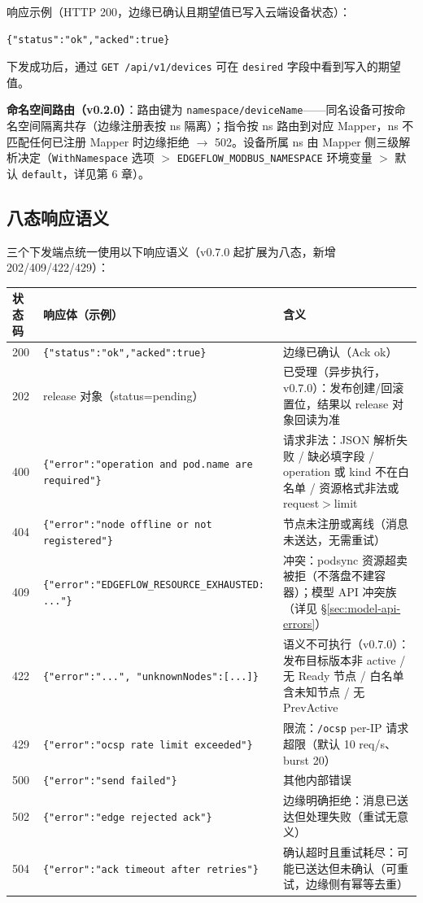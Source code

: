 响应示例（HTTP 200，边缘已确认且期望值已写入云端设备状态）：

\begin{lstlisting}
{"status":"ok","acked":true}
\end{lstlisting}

下发成功后，通过 \texttt{GET /api/v1/devices} 可在 \texttt{desired} 字段中看到写入的期望值。

\textbf{命名空间路由（v0.2.0）}：路由键为 \texttt{namespace/deviceName}——同名设备可按命名空间隔离共存（边缘注册表按 ns 隔离）；指令按 ns 路由到对应 Mapper，ns 不匹配任何已注册 Mapper 时边缘拒绝 $\rightarrow$ 502。设备所属 ns 由 Mapper 侧三级解析决定（\texttt{WithNamespace} 选项 $>$ \texttt{EDGEFLOW\_MODBUS\_NAMESPACE} 环境变量 $>$ 默认 \texttt{default}，详见第 6 章）。

\subsection{八态响应语义}

三个下发端点统一使用以下响应语义（v0.7.0 起扩展为八态，新增 202/409/422/429）：

\begin{tabularx}{\textwidth}{l l X}
  \toprule
  \textbf{状态码} & \textbf{响应体（示例）} & \textbf{含义} \\
  \midrule
  200 & \texttt{\{"status":"ok","acked":true\}} & 边缘已确认（Ack ok） \\
  202 & release 对象（status=pending） & 已受理（异步执行，v0.7.0）：发布创建/回滚置位，结果以 release 对象回读为准 \\
  400 & \texttt{\{"error":"operation and pod.name are required"\}} & 请求非法：JSON 解析失败 / 缺必填字段 / operation 或 kind 不在白名单 / 资源格式非法或 request$>$limit \\
  404 & \texttt{\{"error":"node offline or not registered"\}} & 节点未注册或离线（消息未送达，无需重试） \\
  409 & \texttt{\{"error":"EDGEFLOW\_RESOURCE\_EXHAUSTED: ..."\}} & 冲突：podsync 资源超卖被拒（不落盘不建容器）；模型 API 冲突族（详见 \S\ref{sec:model-api-errors}） \\
  422 & \texttt{\{"error":"...", "unknownNodes":[...]\}} & 语义不可执行（v0.7.0）：发布目标版本非 active / 无 Ready 节点 / 白名单含未知节点 / 无 PrevActive \\
  429 & \texttt{\{"error":"ocsp rate limit exceeded"\}} & 限流：\texttt{/ocsp} per-IP 请求超限（默认 10 req/s、burst 20） \\
  500 & \texttt{\{"error":"send failed"\}} & 其他内部错误 \\
  502 & \texttt{\{"error":"edge rejected ack"\}} & 边缘明确拒绝：消息已送达但处理失败（重试无意义） \\
  504 & \texttt{\{"error":"ack timeout after retries"\}} & 确认超时且重试耗尽：可能已送达但未确认（可重试，边缘侧有幂等去重） \\
  \bottomrule
\end{tabularx}

